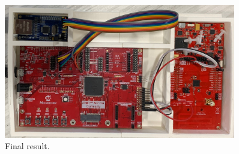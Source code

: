 \begin{figure}[H]
\begin{center}
\includegraphics[width=0.90\textwidth]{final.jpg}
\end{center}
\caption{Final result.}
\label{download}
\end{figure}



